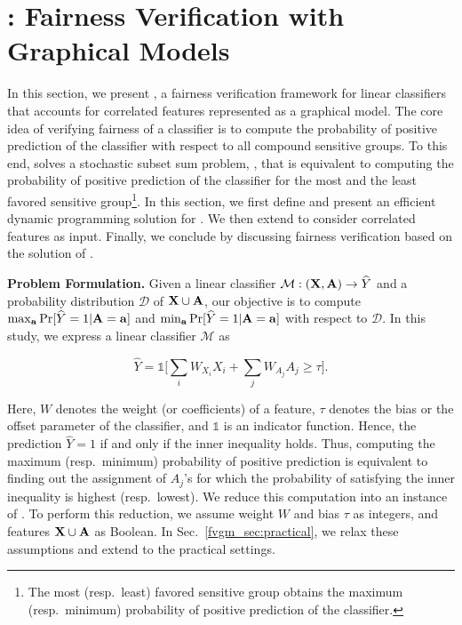 \section{{\fvgm}: Fairness Verification with Graphical Models}\label{fvgm_sec:fvgm}

In this section, we present {\fvgm}, a fairness verification framework for linear classifiers that accounts for correlated features represented as a graphical model. The core idea of verifying fairness of a classifier is to compute the probability of positive prediction of the classifier with respect to all compound sensitive groups. To this end, {\fvgm} solves a stochastic subset sum problem, {\stochastic}, that is equivalent to computing the probability of positive prediction of the classifier for the most and the least favored sensitive group\footnote{The most (resp.\ least) favored sensitive group obtains the maximum (resp.\ minimum) probability of positive prediction of the classifier.}. In this section, we first define {\stochastic} and present an efficient dynamic programming solution for {\stochastic}. We then extend {\stochastic} to consider correlated features as input. Finally, we conclude by discussing fairness verification based on the solution of {\stochastic}.


\textbf{Problem Formulation.}	
Given a linear classifier $ \mathcal{M}: (\mathbf{X}, \mathbf{A}) \rightarrow \widehat{Y} $ and a probability distribution $ \mathcal{D} $ of $ \mathbf{X} \cup \mathbf{A} $, our objective is to compute $ \max_{ \mathbf{a}} \Pr[\widehat{Y} =1 | \mathbf{A} = \mathbf{a}] $ and $ \min_{ \mathbf{a}} \Pr[\widehat{Y} =1 | \mathbf{A} = \mathbf{a}] $ with respect to $ \mathcal{D} $. In this study, we express a linear classifier $\mathcal{M}$ as 

\[	\widehat{Y} = \mathds{1}\Big[\sum_{i} W_{X_i}X_i + \sum_{j} W_{A_j}A_j \ge \tau\Big].\]

Here, $ W $ denotes the weight (or coefficients) of a feature, $ \tau $ denotes the bias or the offset parameter of the classifier, and $\mathds{1}$ is an indicator function. Hence, the prediction $ \widehat{Y} =1 $ if and only if the inner inequality holds.
Thus, computing the maximum (resp.\ minimum) probability of positive prediction is equivalent to finding out the assignment of $A_j$'s for which the probability of satisfying the inner inequality is highest (resp.\ lowest). We reduce this computation into an instance of {\stochastic}. To perform this reduction, we assume  weight $ W $ and bias $ \tau $ as integers, and features $\mathbf{X} \cup \mathbf{A} $ as Boolean. In Sec.~\ref{fvgm_sec:practical}, we relax these assumptions and extend to the practical settings. 

